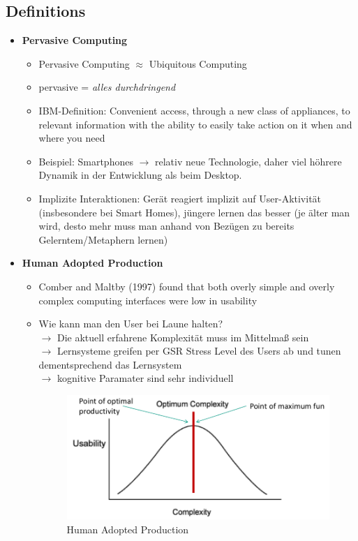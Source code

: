 \subsection{Definitions}
\begin{itemize}
	\item \textbf{Pervasive Computing}
	\begin{itemize}
		\item Pervasive Computing $\approx$ Ubiquitous Computing
		\item pervasive = \textit{alles durchdringend}
		\item IBM-Definition: \glqq Convenient access, through a new class of appliances, to relevant information with the ability to easily take action on it when and where you need\grqq
		\item Beispiel: Smartphones $\rightarrow$ relativ neue Technologie, daher viel höhrere Dynamik in der Entwicklung als beim Desktop. 
		\item Implizite Interaktionen: Gerät reagiert implizit auf User-Aktivität (insbesondere bei Smart Homes), jüngere lernen das besser (je älter man wird, desto mehr muss man anhand von Bezügen zu bereits Gelerntem/Metaphern lernen)
	\end{itemize}
	\item \textbf{Human Adopted Production}
	\begin{itemize}
		\item Comber and Maltby (1997) found that both overly simple and overly complex computing interfaces were low in usability 
		\item Wie kann man den User \glqq bei Laune halten\grqq ?\\
	 	$\rightarrow$ Die aktuell erfahrene Komplexität muss im Mittelmaß sein\\
	 	$\rightarrow$ Lernsysteme greifen per GSR Stress Level des Users ab und tunen dementsprechend das Lernsystem\\
	 	$\rightarrow$ kognitive Paramater sind sehr individuell
		\begin{figure}[h!]
			\centering
			\includegraphics[width=.4\textwidth]{img/ch01_HAP.png}
			\caption{Human Adopted Production}
			\label{HAP}
		\end{figure} 
	\end{itemize}

\end{itemize}
